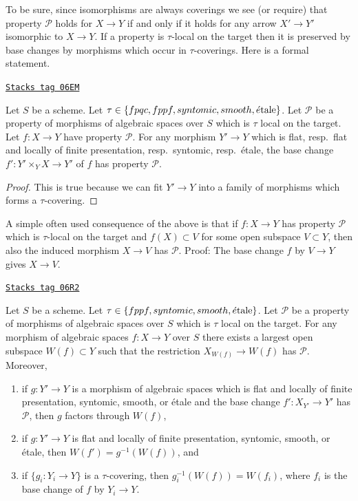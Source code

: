 To be sure, since isomorphisms are always coverings
we see (or require) that property $\mathcal{P}$ holds for $X \to Y$
if and only if it holds for any arrow $X' \to Y'$ isomorphic to $X \to Y$.
If a property is $\tau$-local on the target then it is preserved
by base changes by morphisms which occur in $\tau$-coverings. Here
is a formal statement.

\begin{lemma}
\label{spaces-descent-lemma-pullback-property-local-target}
\href{https://stacks.math.columbia.edu/tag/06EM}{\texttt{Stacks tag 06EM}}

Let $S$ be a scheme.
Let $\tau \in \{fpqc, fppf, syntomic, smooth, \acute{e}\text{tale}\}$.
Let $\mathcal{P}$ be a property of morphisms of algebraic spaces over $S$
which is $\tau$ local on the target. Let $f : X \to Y$ have property
$\mathcal{P}$. For any morphism $Y' \to Y$ which is
flat, resp.\ flat and locally of finite presentation, resp.\ syntomic,
resp.\ \'etale, the base change
$f' : Y' \times_Y X \to Y'$ of $f$ has property $\mathcal{P}$.
\end{lemma}

\begin{proof}
This is true because we can fit $Y' \to Y$ into a family of
morphisms which forms a $\tau$-covering.
\end{proof}

A simple often used consequence of the above is that if
$f : X \to Y$ has property $\mathcal{P}$ which is $\tau$-local
on the target and $f(X) \subset V$
for some open subspace $V \subset Y$, then also the induced
morphism $X \to V$ has $\mathcal{P}$. Proof: The base change
$f$ by $V \to Y$ gives $X \to V$.

\begin{lemma}
\label{spaces-descent-lemma-largest-open-of-the-base}
\href{https://stacks.math.columbia.edu/tag/06R2}{\texttt{Stacks tag 06R2}}

Let $S$ be a scheme.
Let $\tau \in \{fppf, syntomic, smooth, \acute{e}\text{tale}\}$.
Let $\mathcal{P}$ be a property of morphisms of algebraic spaces over $S$
which is $\tau$ local on the target. For any morphism of algebraic spaces
$f : X \to Y$ over $S$ there exists a largest open subspace
$W(f) \subset Y$ such that the restriction $X_{W(f)} \to W(f)$ has
$\mathcal{P}$. Moreover,
\begin{enumerate}
\item if $g : Y' \to Y$ is a morphism of algebraic spaces which is
flat and locally of finite presentation, syntomic, smooth, or \'etale
and the base change $f' : X_{Y'} \to Y'$ has $\mathcal{P}$, then
$g$ factors through $W(f)$,
\item if $g : Y' \to Y$ is flat and locally of finite presentation,
syntomic, smooth, or \'etale, then $W(f') = g^{-1}(W(f))$, and
\item if $\{g_i : Y_i \to Y\}$ is a $\tau$-covering, then
$g_i^{-1}(W(f)) = W(f_i)$, where $f_i$ is the base change of $f$
by $Y_i \to Y$.
\end{enumerate}
\end{lemma}

